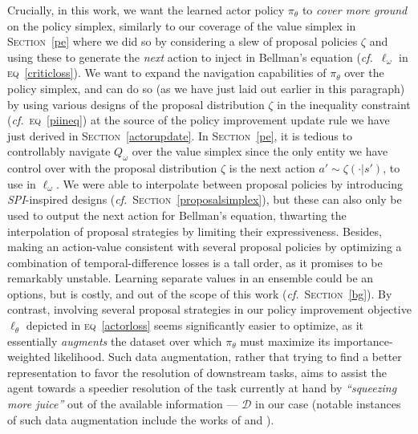 Crucially, in this work, we want the learned actor policy $\pi_\theta$ to \emph{cover more ground} on
the policy simplex, similarly to our coverage of the value simplex in \textsc{Section}~\ref{pe} where we did so
by considering a slew of proposal policies $\zeta$ and using these to generate the \textit{next} action
to inject in Bellman's equation (\textit{cf.}~$\ell_\omega$ in \textsc{eq}~\ref{criticloss}).
We want to expand the navigation capabilities of $\pi_\theta$ over the policy simplex, and can do so
(as we have just laid out earlier in this paragraph) by using various designs of the proposal distribution
$\zeta$ in the inequality constraint (\textit{cf.}~\textsc{eq}~\ref{piineq}) at the source of the
policy improvement update rule we have just derived in \textsc{Section}~\ref{actorupdate}.
In \textsc{Section}~\ref{pe}, it is tedious to controllably navigate $Q_\omega$ over the value simplex
since the only entity we have control over with the proposal distribution $\zeta$ is the next action
$a' \sim \zeta(\cdot | s')$, to use in $\ell_\omega$.
We were able to interpolate between proposal policies by introducing \textit{SPI}-inspired designs
(\textit{cf.}~\textsc{Section}~\ref{proposalsimplex}),
but these can also only be used to output the next action for Bellman's equation, thwarting the
interpolation of proposal strategies by limiting their expressiveness.
Besides, making an action-value consistent with several proposal policies by optimizing a
combination of temporal-difference losses is a tall order, as it promises to be remarkably unstable.
Learning separate values in an ensemble could be an options, but is costly, and out of the scope of this work
(\textit{cf.}~\textsc{Section}~\ref{bg}).
By contrast, involving several proposal strategies
in our policy improvement objective $\ell_\theta$ depicted in \textsc{eq}~\ref{actorloss}
seems significantly easier to optimize,
as it essentially \emph{augments} the dataset over which $\pi_\theta$ must maximize its
importance-weighted likelihood.
Such data augmentation, rather that trying to find a better representation to favor the resolution of
downstream tasks, aims to assist the agent towards a speedier resolution of the task currently at hand
by \textit{``squeezing more juice''} out of the available information --- $\mathcal{D}$ in our case
(notable instances of such data augmentation include the works of
\cite{Kaelbling1993-dv} and \cite{Andrychowicz2017-mn}).

